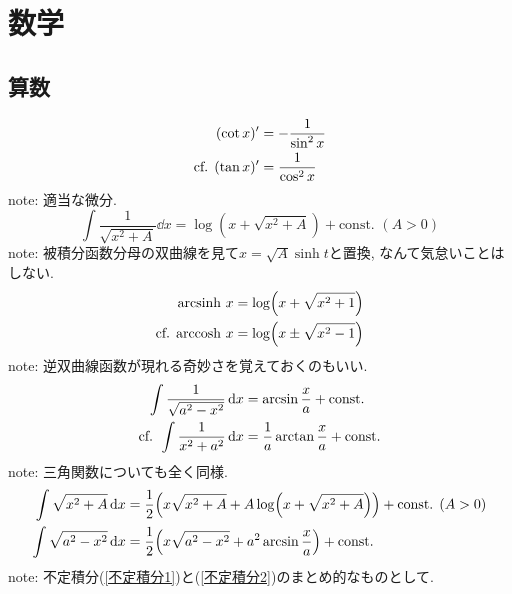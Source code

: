 \part{数学} %
\label{prt:数学}
\chapter*{算数} %
\label{cha:算数}
\begin{align}
    (\cot x)' &= -\frac{1}{\sin^2x} \\
    \text{cf. }(\tan x)' &= \frac{1}{\cos^2x}\notag
\end{align}
note: 適当な微分. 
\begin{equation}
\label{不定積分1}
    \int\frac{1}{\sqrt{x^2+A}}\dd{x} = \log(x+\sqrt{x^2+A})+\text{const. }(A>0)
\end{equation}
note: 被積分函数分母の双曲線を見て$x=\sqrt{A}\sinh t$と置換, なんて気怠いことはしない. 
\begin{align}
\label{逆双曲線関数}
    \mathrm{arcsinh}\ x &= \log(x+\sqrt{x^2+1}) \\
    \text{cf. }\mathrm{arccosh}\ x &= \log(x\pm\sqrt{x^2-1})\notag
\end{align}
note: 逆双曲線函数が現れる奇妙さを覚えておくのもいい. 
\begin{align}
\label{不定積分2}
    \int\frac{1}{\sqrt{a^2-x^2}}\dd{x} &= \arcsin\frac{x}{a}+\text{const.} \\
    \text{cf. }\int\frac{1}{x^2+a^2}\dd{x} &= \frac{1}{a}\arctan\frac{x}{a}+\text{const.}\notag
\end{align}
note: 三角関数についても全く同様. 
\begin{align}
    \int\sqrt{x^2+A}\dd{x} &= \frac{1}{2}\qty(x\sqrt{x^2+A}+A\log(x+\sqrt{x^2+A}))+\text{const. }(A>0) \\
    \int\sqrt{a^2-x^2}\dd{x} &= \frac{1}{2}\qty(x\sqrt{a^2-x^2}+a^2\arcsin\frac{x}{a})+\text{const.}
\end{align}
note: 不定積分(\ref{不定積分1})と(\ref{不定積分2})のまとめ的なものとして. 

